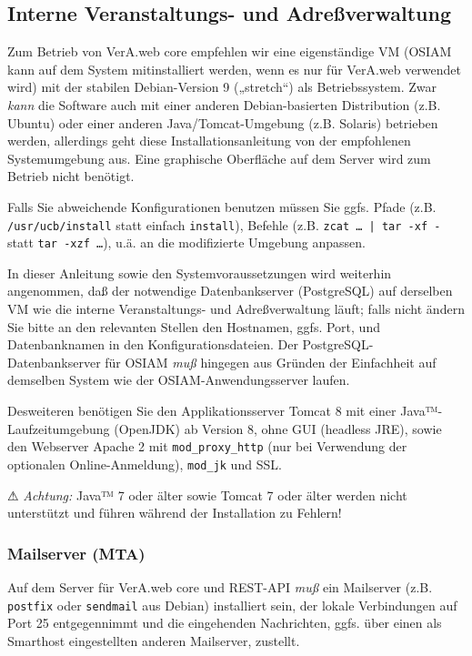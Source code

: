 \documentclass{tarentanleitung}
\begin{document}
\subsection{Interne Veranstaltungs- und Adreßverwaltung}\label{subsec:req-core}

Zum Betrieb von VerA.web core empfehlen wir eine eigenständige VM
(OSIAM kann auf dem System mitinstalliert werden, wenn es nur für
VerA.web verwendet wird) mit der stabilen Debian-Version 9 („stretch“)
als Betriebssystem. Zwar \emph{kann} die Software auch mit einer
anderen Debian-basierten Distribution (z.B. Ubuntu) oder einer
anderen Java/Tomcat-Umgebung (z.B. Solaris) betrieben werden,
allerdings geht diese Installationsanleitung von der empfohlenen
Systemumgebung aus. Eine graphische Oberfläche auf dem Server wird
zum Betrieb nicht benötigt.

Falls Sie abweichende Konfigurationen benutzen müssen Sie ggfs.
Pfade (z.B. \texttt{/usr/ucb/install} statt einfach \texttt{install}),
Befehle (z.B. \texttt{zcat … | tar -xf -} statt \texttt{tar -xzf …}),
u.ä. an die modifizierte Umgebung anpassen.

In dieser Anleitung sowie den Systemvoraussetzungen wird weiterhin
angenommen, daß der notwendige Datenbankserver (PostgreSQL) auf
derselben VM wie die interne Veranstaltungs- und Adreßverwaltung läuft;
falls nicht ändern Sie bitte an den relevanten Stellen den Hostnamen,
ggfs. Port, und Datenbanknamen in den Konfigurationsdateien.
Der PostgreSQL-Datenbankserver für OSIAM \emph{muß} hingegen aus Gründen
der Einfachheit auf demselben System wie der OSIAM-Anwendungsserver laufen.

Desweiteren benötigen Sie den Applikationsserver Tomcat 8 mit einer
Java™-Laufzeitumgebung (OpenJDK) ab Version 8, ohne GUI (headless JRE),
sowie den Webserver Apache 2 mit \texttt{mod\_proxy\_http} (nur bei
Verwendung der optionalen Online-Anmeldung), \texttt{mod\_jk} und SSL.

⚠ \emph{Achtung:} Java™ 7 oder älter sowie Tomcat 7 oder älter werden
nicht unterstützt und führen während der Installation zu Fehlern!

\subsubsection{Mailserver (MTA)}\label{subsubsec:req-core-mta}

Auf dem Server für VerA.web core und REST-API \emph{muß} ein
Mailserver (z.B. \texttt{postfix} oder \texttt{sendmail} aus Debian)
installiert sein, der lokale Verbindungen auf Port 25 entgegennimmt
und die eingehenden Nachrichten, ggfs. über einen als Smarthost
eingestellten anderen Mailserver, zustellt.
\end{document}
